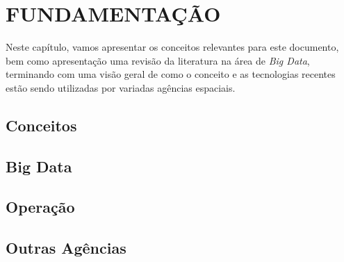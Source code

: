 
\chapter{FUNDAMENTAÇÃO}

Neste capítulo, vamos apresentar os conceitos relevantes para este documento, bem como apresentação uma revisão da literatura na área de \textit{Big Data}, terminando com uma visão geral de como o conceito e as tecnologias recentes estão sendo utilizadas por variadas agências espaciais.

\section{Conceitos}

\section{Big Data}

\section{Operação}

\section{Outras Agências}



